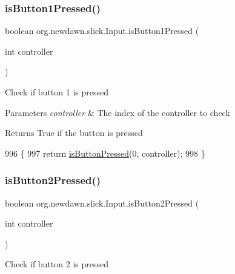\subsubsection{\texorpdfstring{is\+Button1\+Pressed()}{isButton1Pressed()}}
{\footnotesize\ttfamily boolean org.\+newdawn.\+slick.\+Input.\+is\+Button1\+Pressed (\begin{DoxyParamCaption}\item[{int}]{controller }\end{DoxyParamCaption})\hspace{0.3cm}{\ttfamily [inline]}}

Check if button 1 is pressed


\begin{DoxyParams}{Parameters}
{\em controller} & The index of the controller to check \\
\hline
\end{DoxyParams}
\begin{DoxyReturn}{Returns}
True if the button is pressed 
\end{DoxyReturn}

\begin{DoxyCode}
996                                                     \{
997         \textcolor{keywordflow}{return} \mbox{\hyperlink{classorg_1_1newdawn_1_1slick_1_1_input_a82287bcba0cef087bcb8a92f1bcd3d53}{isButtonPressed}}(0, controller);
998     \}
\end{DoxyCode}
\mbox{\label{classorg_1_1newdawn_1_1slick_1_1_input_a5e0bc9417240b65b84bc11db649f4a6a}} 
\subsubsection{\texorpdfstring{is\+Button2\+Pressed()}{isButton2Pressed()}}
{\footnotesize\ttfamily boolean org.\+newdawn.\+slick.\+Input.\+is\+Button2\+Pressed (\begin{DoxyParamCaption}\item[{int}]{controller }\end{DoxyParamCaption})\hspace{0.3cm}{\ttfamily [inline]}}

Check if button 2 is pressed



